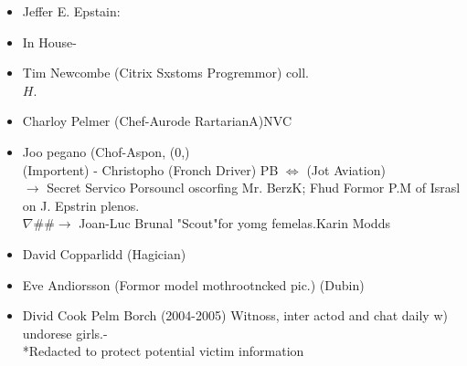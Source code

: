 \documentclass[10pt]{article}
\begin{document}
\begin{itemize}
  \item Jeffer E. Epstain:
\end{itemize}

\begin{itemize}
  \item In House-
  \item Tim Newcombe (Citrix Sxstoms Progremmor) coll.\\
\(H\).
  \item Charloy Pelmer (Chef-Aurode RartarianA)NVC
  \item Joo pegano (Chof-Aspon, (0,)\\
(Importent) - Christopho (Fronch Driver) PB \(\Leftrightarrow\) (Jot Aviation)\\
\(\rightarrow\) Secret Servico Porsouncl oscorfing Mr. BerzK; Fhud Formor P.M of Israsl on J. Epstrin plenos.\\
\(\nabla \# \# \rightarrow\) Joan-Luc Brunal "Scout"for yomg femelas.Karin Modds
  \item David Copparlidd (Hagician)
  \item Eve Andiorsson (Formor model mothrootncked pic.) (Dubin)
  \item Divid Cook Pelm Borch (2004-2005) Witnoss, inter actod and chat daily w) undorese girls.-\\
*Redacted to protect potential victim information
\end{itemize}
\end{document}
